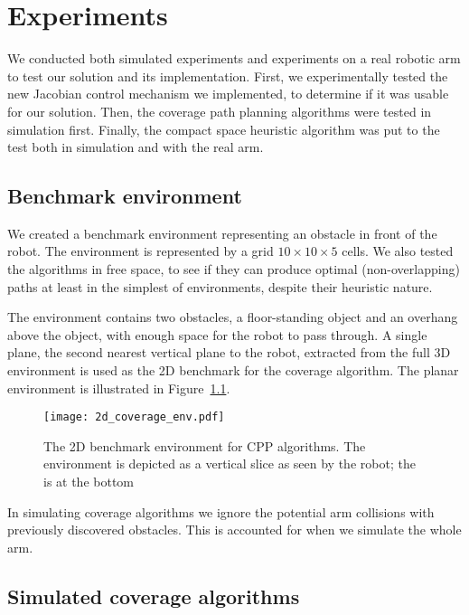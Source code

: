 \documentclass[buriama8_dp.tex]{subfiles}
\begin{document}
\chapter{Experiments}

We conducted both simulated experiments and experiments on a real robotic arm to test our solution and its implementation. First, we experimentally tested the new Jacobian control mechanism we implemented, to determine if it was usable for our solution. Then, the coverage path planning algorithms were tested in simulation first. Finally, the compact space heuristic algorithm was put to the test both in simulation and with the real arm.

\section{Benchmark environment}
\label{sec:exp_cpp_env}

We created a benchmark environment representing an obstacle in front of the robot. The environment is represented by a grid \(10 \times 10 \times 5\) cells. We also tested the algorithms in free space, to see if they can produce optimal (non-overlapping) paths at least in the simplest of environments, despite their heuristic nature.

The environment contains two obstacles, a floor-standing object and an overhang above the object, with enough space for the robot to pass through. A single plane, the second nearest vertical plane to the robot, extracted from the full 3D environment is used as the 2D benchmark for the coverage algorithm. The planar environment is illustrated in Figure~\ref{fig:2d_env}.

\begin{figure}[htp]
  \centering
  \texttt{[image: 2d\_coverage\_env.pdf]}
  \caption[2D benchmark environment]{The 2D benchmark environment for CPP algorithms. The environment is depicted as a vertical slice as seen by the robot; the  is at the bottom}
  \label{fig:2d_env}
\end{figure}

In simulating coverage algorithms we ignore the potential arm collisions with previously discovered obstacles. This is accounted for when we simulate the whole arm.

\section{Simulated coverage algorithms}
\label{sec:exp_sim_coverage}
\end{document}
